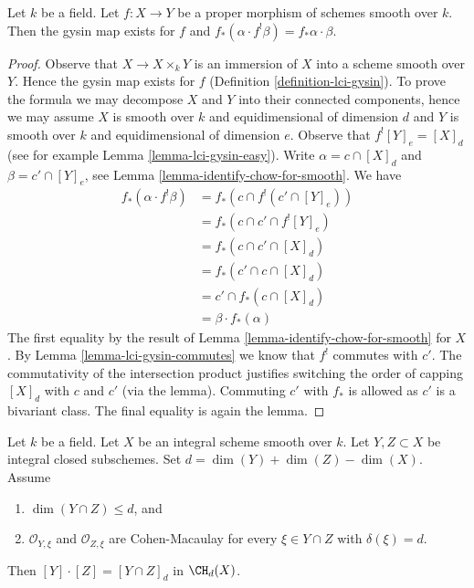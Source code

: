 \begin{lemma}
\label{lemma-projection-formula}
Let $k$ be a field. Let $f : X \to Y$ be a proper morphism of schemes smooth
over $k$. Then the gysin map exists for $f$ and
$f_*(\alpha \cdot f^!\beta) = f_*\alpha \cdot \beta$.
\end{lemma}

\begin{proof}
Observe that $X \to X \times_k Y$ is an immersion of $X$ into a scheme
smooth over $Y$. Hence the gysin map exists for $f$
(Definition \ref{definition-lci-gysin}).
To prove the formula we may decompose $X$ and $Y$ into their
connected components, hence we may assume $X$ is smooth over $k$
and equidimensional of dimension $d$ and $Y$ is smooth over $k$
and equidimensional of dimension $e$. Observe that
$f^![Y]_e = [X]_d$ (see for example Lemma \ref{lemma-lci-gysin-easy}).
Write $\alpha = c \cap [X]_d$ and $\beta = c' \cap [Y]_e$,
see Lemma \ref{lemma-identify-chow-for-smooth}. We have
\begin{align*}
f_*(\alpha \cdot f^!\beta)
& =
f_*(c \cap f^!(c' \cap [Y]_e)) \\
& =
f_*(c \cap c' \cap f^![Y]_e) \\
& =
f_*(c \cap c' \cap [X]_d) \\
& =
f_*(c' \cap c \cap [X]_d) \\
& =
c' \cap f_*(c \cap [X]_d) \\
& =
\beta \cdot f_*(\alpha)
\end{align*}
The first equality by the result of Lemma \ref{lemma-identify-chow-for-smooth}
for $X$. By Lemma \ref{lemma-lci-gysin-commutes} we know that $f^!$
commutes with $c'$. The commutativity of the intersection
product justifies switching the order of capping $[X]_d$ with $c$ and $c'$
(via the lemma). Commuting $c'$ with $f_*$ is allowed as $c'$
is a bivariant class. The final equality is again the lemma.
\end{proof}

\begin{lemma}
\label{lemma-intersect-properly}
Let $k$ be a field. Let $X$ be an integral scheme smooth over $k$.
Let $Y, Z \subset X$ be integral closed subschemes. Set
$d = \dim(Y) + \dim(Z) - \dim(X)$. Assume
\begin{enumerate}
\item $\dim(Y \cap Z) \leq d$, and
\item $\mathcal{O}_{Y, \xi}$ and $\mathcal{O}_{Z, \xi}$
are Cohen-Macaulay for every $\xi \in Y \cap Z$ with
$\delta(\xi) = d$.
\end{enumerate}
Then $[Y] \cdot [Z] = [Y \cap Z]_d$ in $\CH_d(X)$.
\end{lemma}


